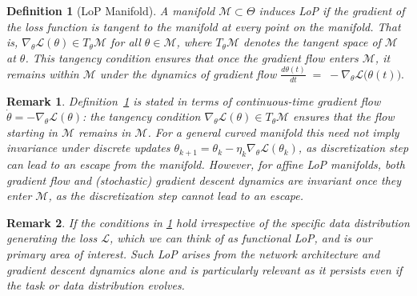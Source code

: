 \documentclass{article}
\newcommand{\Loss}{\mathcal{L}}
\newtheorem{definition}{Definition}[section]
\newtheorem{remark}{Remark}[section]
\numberwithin{figure}{section}
\begin{document}
\begin{definition}[LoP Manifold]
\label{def:lop}
A manifold $\mathcal{M}\subset\Theta$ induces LoP if the gradient of the loss function is tangent to the manifold at every point on the manifold. That is, $\nabla_\theta\Loss(\theta)\in T_\theta\mathcal{M}$ for all $\theta\in\mathcal{M}$, where $T_\theta\mathcal{M}$ denotes the tangent space of $\mathcal{M}$ at $\theta$. This tangency condition ensures that once the gradient flow enters $\mathcal{M}$, it remains within $\mathcal{M}$ under the dynamics of gradient flow $\frac{d\theta(t)}{dt} \;=\; -\nabla_\theta\Loss\bigl(\theta(t)\bigr).$
\end{definition}



\begin{remark}
\label{rem:flow-vs-gd}
Definition~\ref{def:lop} is stated in terms of continuous-time gradient flow
$\dot\theta = -\nabla_\theta \Loss(\theta)$: the tangency condition
$\nabla_\theta \Loss(\theta) \in T_\theta \mathcal{M}$ ensures that the flow
starting in $\mathcal{M}$ remains in $\mathcal{M}$. For a general curved
manifold this need not imply invariance under discrete updates
$\theta_{k+1} = \theta_k - \eta_k \nabla_\theta \Loss(\theta_k)$, as discretization step can lead to an escape from the manifold. However, for \emph{affine} LoP manifolds,
both gradient flow and (stochastic) gradient descent dynamics are invariant
once they enter $\mathcal{M}$, as the discretization step cannot  lead to an escape.
\end{remark}


\begin{remark}
If the conditions in \cref{def:lop} hold irrespective of the specific data distribution generating the loss $\Loss$, which we can think of as functional LoP, and is our primary area of interest. Such LoP arises from the network architecture and gradient descent dynamics alone and is particularly relevant as it persists even if the task or data distribution evolves.
\end{remark}
\end{document}
